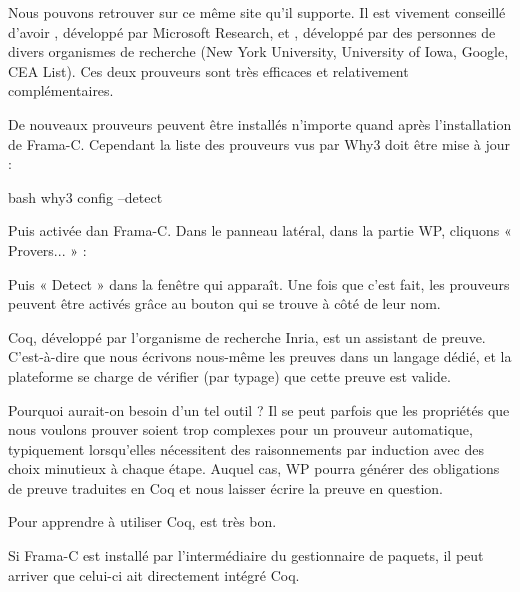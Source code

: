 Nous pouvons retrouver sur ce même site 
 qu'il supporte.
Il est vivement conseillé d'avoir ,
développé par Microsoft Research, et ,
développé par des personnes de divers organismes de recherche (New York 
University, University of Iowa, Google, CEA List). Ces deux prouveurs sont très
efficaces et relativement complémentaires.


De nouveaux prouveurs peuvent être installés n'importe quand après
l'installation de Frama-C. Cependant la liste des prouveurs vus par Why3
doit être mise à jour :


\begin{CodeBlock}{bash}
why3 config --detect
\end{CodeBlock}


Puis activée dan Frama-C. Dans le panneau latéral, dans la partie WP,
cliquons « Provers... » :




Puis « Detect » dans la fenêtre qui apparaît. Une fois que c'est fait,
les prouveurs peuvent être activés grâce au bouton qui se trouve à côté
de leur nom.






Coq, développé par l'organisme de recherche Inria, est un assistant de 
preuve. C'est-à-dire que nous écrivons nous-même les preuves dans un 
langage dédié, et la plateforme se charge de vérifier (par typage) que 
cette preuve est valide.



Pourquoi aurait-on besoin d'un tel outil ? Il se peut parfois que les 
propriétés que nous voulons prouver soient trop complexes pour un prouveur 
automatique, typiquement lorsqu'elles nécessitent des raisonnements par
induction avec des choix minutieux à chaque étape. Auquel cas, WP pourra 
générer des obligations de preuve traduites en Coq et nous laisser écrire 
la preuve en question.



Pour apprendre à utiliser Coq, 
est très bon.



\begin{Information}
Si Frama-C est installé par l'intermédiaire du gestionnaire de 
paquets, il peut arriver que celui-ci ait directement intégré Coq.
\end{Information}


